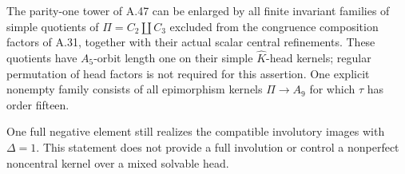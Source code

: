 The parity-one tower of A.47 can be enlarged by
all finite invariant families of simple quotients
of \(\Pi=C_2\amalg C_3\) excluded from the
congruence composition factors of A.31, together
with their actual scalar central refinements.
These quotients have \(A_5\)-orbit length one
on their simple \(\widehat K\)-head kernels;
regular permutation of head factors is not
required for this assertion. One explicit
nonempty family consists of all epimorphism
kernels \(\Pi\to A_9\) for which \(\tau\)
has order fifteen.

One full negative element still realizes the
compatible involutory images with \(\Delta=1\).
This statement does not provide a full
involution or control a nonperfect noncentral
kernel over a mixed solvable head.

